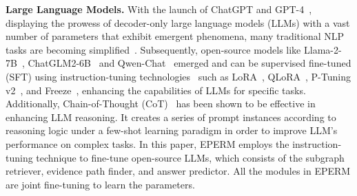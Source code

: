\noindent \textbf{Large Language Models.} 
With the launch of ChatGPT and GPT-4~\cite{openai2023gpt}, displaying the prowess of decoder-only large language models (LLMs) with a vast number of parameters that exhibit emergent phenomena, many traditional NLP tasks are becoming simplified~\cite{hadi2023survey}. Subsequently, open-source models like Llama-2-7B~\cite{touvron2023llama}, ChatGLM2-6B~\cite{zeng2022glm} and Qwen-Chat~\cite{bai2023qwen} emerged and can be supervised fine-tuned (SFT) using instruction-tuning technologies~\cite{zhang2023fc} such as LoRA~\cite{hu2021lora}, QLoRA~\cite{dettmers2024qlora}, P-Tuning v2~\cite{liu2021p}, and Freeze~\cite{geva2020transformer}, enhancing the capabilities of LLMs for specific tasks. Additionally, Chain-of-Thought (CoT)~\cite{wei2022chain} has been shown to be effective in enhancing LLM reasoning. It creates a series of prompt instances according to reasoning logic under a few-shot learning paradigm in order to improve LLM’s performance on complex tasks. In this paper, EPERM employs the instruction-tuning technique to fine-tune open-source LLMs, which consists of the subgraph retriever, evidence path finder, and answer predictor. All the modules in EPERM are joint fine-tuning to learn the parameters.